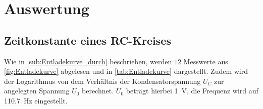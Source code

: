 \section{Auswertung}
\label{sec:Auswertung}

\subsection{Zeitkonstante eines RC-Kreises} %
\label{sub:Zeitkonstante}

\noindent Wie in \autoref{sub:Entladekurve_durch} beschrieben, werden $12$ Messwerte aus \autoref{fig:Entladekurve} abgelesen und in \autoref{tab:Entladekurve} dargestellt.
Zudem wird der Logarithmus von dem Verhältnis der Kondensatorspannung $U_C$ zur angelegten Spannung $U_0$ berechnet. $U_0$ beträgt hierbei \qty{1}{\volt},
die Frequenz wird auf \qty{110.7}{\hertz} eingestellt.

